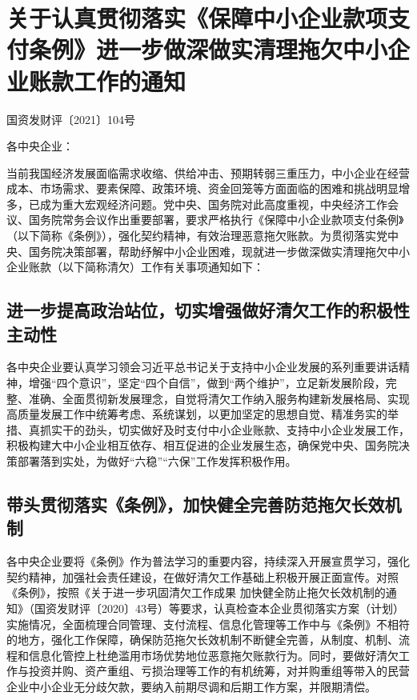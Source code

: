 \chapter{关于认真贯彻落实《保障中小企业款项支付条例》进一步做深做实清理拖欠中小企业账款工作的通知}

\begin{center}
国资发财评〔2021〕104号
\end{center}

\noindent 各中央企业：

当前我国经济发展面临需求收缩、供给冲击、预期转弱三重压力，中小企业在经营成本、市场需求、要素保障、政策环境、资金回笼等方面面临的困难和挑战明显增多，已成为重大宏观经济问题。党中央、国务院对此高度重视，中央经济工作会议、国务院常务会议作出重要部署，要求严格执行《保障中小企业款项支付条例》（以下简称《条例》），强化契约精神，有效治理恶意拖欠账款。为贯彻落实党中央、国务院决策部署，帮助纾解中小企业困难，现就进一步做深做实清理拖欠中小企业账款（以下简称清欠）工作有关事项通知如下：

\section{进一步提高政治站位，切实增强做好清欠工作的积极性主动性}

各中央企业要认真学习领会习近平总书记关于支持中小企业发展的系列重要讲话精神，增强“四个意识”，坚定“四个自信”，做到“两个维护”，立足新发展阶段，完整、准确、全面贯彻新发展理念，自觉将清欠工作纳入服务构建新发展格局、实现高质量发展工作中统筹考虑、系统谋划，以更加坚定的思想自觉、精准务实的举措、真抓实干的劲头，切实做好及时支付中小企业账款、支持中小企业发展工作，积极构建大中小企业相互依存、相互促进的企业发展生态，确保党中央、国务院决策部署落到实处，为做好“六稳”“六保”工作发挥积极作用。

\section{带头贯彻落实《条例》，加快健全完善防范拖欠长效机制}

各中央企业要将《条例》作为普法学习的重要内容，持续深入开展宣贯学习，强化契约精神，加强社会责任建设，在做好清欠工作基础上积极开展正面宣传。对照《条例》，按照《关于进一步巩固清欠工作成果 加快健全防止拖欠长效机制的通知》（国资发财评〔2020〕43号）等要求，认真检查本企业贯彻落实方案（计划）实施情况，全面梳理合同管理、支付流程、信息化管理等工作中与《条例》不相符的地方，强化工作保障，确保防范拖欠长效机制不断健全完善，从制度、机制、流程和信息化管控上杜绝滥用市场优势地位恶意拖欠账款行为。同时，要做好清欠工作与投资并购、资产重组、亏损治理等工作的有机统筹，对并购重组等带入的民营企业中小企业无分歧欠款，要纳入前期尽调和后期工作方案，并限期清偿。

